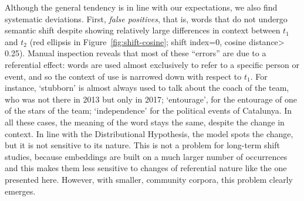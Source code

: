 Although the general tendency is in line with our expectations, we
also find systematic deviations. First, \textit{false positives}, that
is, words that do not undergo semantic shift despite showing
relatively large differences in context between $t_1$ and $t_2$ (red ellipsis in
Figure~\ref{fig:shift-cosine}; shift index=0, cosine distance\textgreater	
0.25). 
Manual inspection reveals that most of these ``errors'' 
are due to a referential effect: words are used
almost exclusively to refer to a specific person or event, and
so the context of use is narrowed down with respect to $t_1$.
For instance, `stubborn' is
almost always used to talk about the coach of the team, who was not
there in 2013 but only in 2017; 
`entourage', for the entourage of one of the stars of the team; `independence' for the
political events of Catalunya. 
In all these cases, the meaning of the word stays the same, despite the change in context. In line with the Distributional Hypothesis, the model spots the change, but it is not sensitive to its nature.
This is not a problem for long-term shift studies, because embeddings
are built on a much larger number of occurrences
and this makes them less sensitive to changes of referential
nature like the one presented here. However, with smaller, community corpora, this problem clearly emerges.




